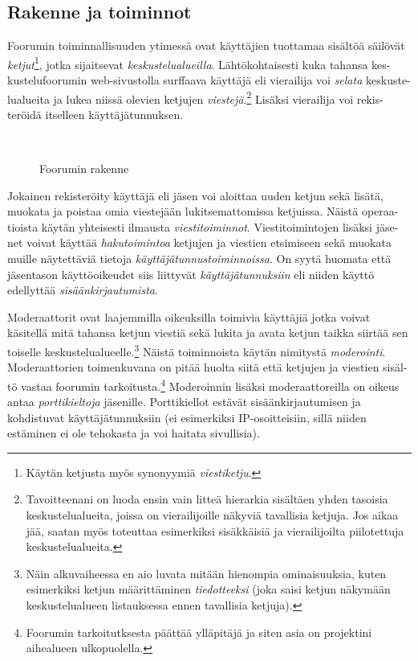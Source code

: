 \documentclass[11pt]{article}
\begin{document}
	\subsection{Rakenne ja toiminnot}
		Foorumin toiminnallisuuden ytimessä ovat käyttäjien tuottamaa sisältöä säilövät
		\emph{ketjut}\footnote{Käytän ketjusta myös synonyymiä \emph{viestiketju}.}, jotka
		sijaitsevat \emph{keskustelualueilla}. Lähtökohtaisesti kuka tahansa kes-kustelufoorumin web-sivustolla
		surffaava käyttäjä eli vierailija voi \emph{selata} keskuste-lualueita ja lukea niissä olevien ketjujen
		\emph{viestejä}.\footnote{
		Tavoitteenani on luoda ensin vain litteä hierarkia sisältäen yhden tasoisia keskustelualueita,
		joissa on vierailijoille näkyviä tavallisia ketjuja. Jos aikaa jää, saatan myös toteuttaa esimerkiksi
		sisäkkäisiä ja vierailijoilta piilotettuja keskustelualueita.}
		Lisäksi vierailija voi rekis-teröidä itselleen käyttäjätunnuksen.	
	
		\begin{figure}[H]
			\centering
			\\
			\caption{Foorumin rakenne}
		\end{figure}
	
		Jokainen rekisteröity käyttäjä eli jäsen voi aloittaa uuden ketjun sekä lisätä, muokata ja poistaa
		omia viestejään lukitsemattomissa ketjuissa. Näistä operaa-tioista käytän yhteisesti ilmausta
		\emph{viestitoiminnot}. Viestitoimintojen lisäksi jäse-net voivat käyttää \emph{hakutoimintoa}
		ketjujen ja viestien etsimiseen sekä muokata muille näytettäviä tietoja \emph{käyttäjätunnustoiminnoissa}. On syytä huomata että jäsentason käyttöoikeudet siis liittyvät
		\emph{käyttäjätunnuksiin} eli niiden käyttö edellyttää \emph{sisäänkirjautumista}.
	
		Moderaattorit ovat laajemmilla oikeuksilla toimivia
		käyttäjiä jotka voivat käsitellä mitä tahansa ketjun viestiä sekä lukita ja avata ketjun taikka siirtää
		sen toiselle keskustelualueelle.\footnote{Näin alkuvaiheessa en aio luvata mitään hienompia
		ominaisuuksia, kuten esimerkiksi ketjun määrittäminen \emph{tiedotteeksi} (joka saisi ketjun näkymään
		keskustelualueen listauksessa ennen tavallisia ketjuja).}
		Näistä toiminnoista käytän nimitystä \emph{moderointi}.
		Moderaattorien toimenkuvana on pitää huolta siitä että ketjujen ja viestien sisäl-tö vastaa foorumin
		tarkoitusta.\footnote{Foorumin tarkoitutksesta päättää ylläpitäjä ja siten asia on projektini
		aihealueen ulkopuolella.}
		Moderoinnin lisäksi moderaattoreilla on oikeus antaa \emph{porttikieltoja} jäsenille. Porttikiellot
		estävät sisäänkirjautumisen ja kohdistuvat käyttäjätunnuksiin (ei esimerkiksi IP-osoitteisiin, sillä
		niiden estäminen ei ole tehokasta ja voi haitata sivullisia).
	
\end{document}
